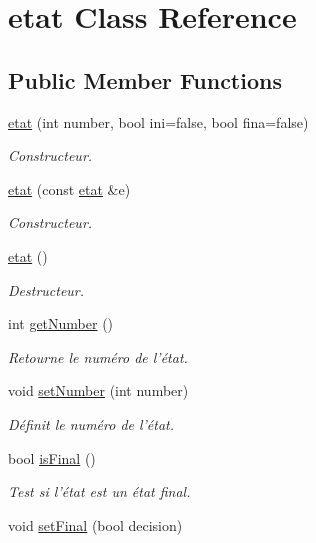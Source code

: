 \hypertarget{classetat}{\section{etat Class Reference}
\label{classetat}
}
\subsection*{Public Member Functions}
\begin{DoxyCompactItemize}
\item 
\hyperlink{classetat_ad34378d04abb8957bdfce91129af74a7}{etat} (int number, bool ini=false, bool fina=false)
\begin{DoxyCompactList}\small\item\em Constructeur. \end{DoxyCompactList}\item 
\hyperlink{classetat_af42b35ca878600e1877052978a11303f}{etat} (const \hyperlink{classetat}{etat} \&e)
\begin{DoxyCompactList}\small\item\em Constructeur. \end{DoxyCompactList}\item 
\hyperlink{classetat_a9a8af0c9c7e32293342e6d147a5f2b7b}{etat} ()
\begin{DoxyCompactList}\small\item\em Destructeur. \end{DoxyCompactList}\item 
int \hyperlink{classetat_a0eeba3eaa0ce8633957d309f04f07995}{get\-Number} ()
\begin{DoxyCompactList}\small\item\em Retourne le numéro de l'état. \end{DoxyCompactList}\item 
void \hyperlink{classetat_a014f6f12767d69825f7a3d4d610a2c97}{set\-Number} (int number)
\begin{DoxyCompactList}\small\item\em Définit le numéro de l'état. \end{DoxyCompactList}\item 
bool \hyperlink{classetat_a89188d6ea23ce287c3f3afda46fa2858}{is\-Final} ()
\begin{DoxyCompactList}\small\item\em Test si l'état est un état final. \end{DoxyCompactList}\item 
void \hyperlink{classetat_afc8af7e41796cf05670e9b2856ffcd73}{set\-Final} (bool decision)

\end{DoxyCompactItemize}
